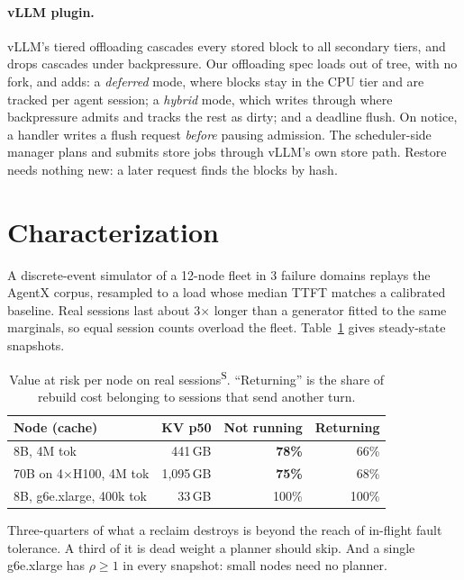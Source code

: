 \documentclass[10pt,twocolumn]{article}
\newcommand{\Sim}{\textsuperscript{S}}
\begin{document}
\paragraph{vLLM plugin.} vLLM's tiered offloading cascades every stored block to all
secondary tiers, and drops cascades under backpressure. Our offloading spec loads out
of tree, with no fork, and adds: a \emph{deferred} mode, where blocks stay in the CPU
tier and are tracked per agent session; a \emph{hybrid} mode, which writes through
where backpressure admits and tracks the rest as dirty; and a deadline flush. On
notice, a handler writes a flush request \emph{before} pausing admission. The
scheduler-side manager plans and submits store jobs through vLLM's own store path.
Restore needs nothing new: a later request finds the blocks by hash.

\section{Characterization}\label{sec:char}
A discrete-event simulator of a 12-node fleet in 3 failure domains replays the AgentX
corpus, resampled to a load whose median TTFT matches a calibrated baseline. Real
sessions last about 3$\times$ longer than a generator fitted to the same marginals,
so equal session counts overload the fleet. Table~\ref{tab:char} gives steady-state
snapshots.
\begin{table}[t]
\centering\footnotesize\setlength{\tabcolsep}{3.5pt}
\begin{tabular}{@{}lrrr@{}}
\toprule
Node (cache) & KV p50 & Not running & Returning \\
\midrule
8B, 4M tok & 441\,GB & \textbf{78\%} & 66\% \\
70B on 4$\times$H100, 4M tok & 1{,}095\,GB & \textbf{75\%} & 68\% \\
8B, g6e.xlarge, 400k tok & 33\,GB & 100\% & 100\% \\
\bottomrule
\end{tabular}
\caption{Value at risk per node on real sessions\Sim. ``Returning'' is the share of
rebuild cost belonging to sessions that send another turn.}
\label{tab:char}
\end{table}
Three-quarters of what a reclaim destroys is beyond the reach of in-flight fault
tolerance. A third of it is dead weight a planner should skip. And a single
g6e.xlarge has $\rho \ge 1$ in every snapshot: small nodes need no planner.
\end{document}
